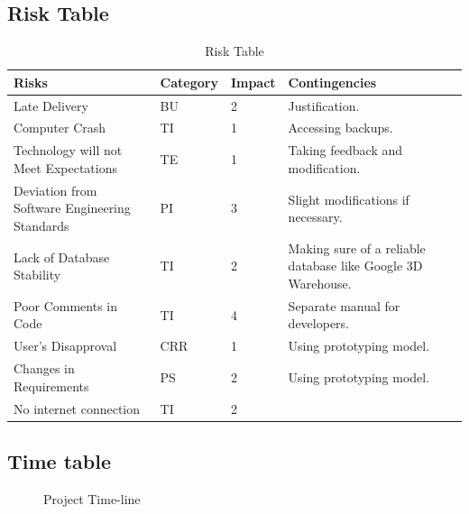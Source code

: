 \subsection{Risk Table}
\begin{table}[h!]
\caption{Risk Table}
  \centering
\begin{tabular}{|p{3.5cm}| p{2cm} | p{2.3cm} | p{4cm}|}
\hline
Risks                                         & Category  & Impact &Contingencies \\ \hline
Late Delivery                                & BU               & 2   &  Justification. \\ \hline
Computer Crash                                 & TI              & 1 & Accessing backups.   \\ \hline
Technology will not Meet Expectations         & TE            & 1    & Taking feedback and modification. \\ \hline
Deviation from Software Engineering Standards       & PI               & 3  & Slight modifications if necessary.  \\ \hline
Lack of Database Stability                & TI             & 2   &  Making sure of a reliable database like Google 3D Warehouse. \\ \hline
Poor Comments in Code                         & TI              & 4  & Separate manual for developers.   \\ \hline
User’s Disapproval                            & CRR             & 1   & Using prototyping model.  \\ \hline
Changes in Requirements                                & PS             & 2   &  Using prototyping model. \\ \hline
No internet connection                        & TI             & 2  &    \\ \hline
\end{tabular}
\end{table}
\newpage
\subsection{Time table}
\begin{figure}[htbp]
	\centering
	\caption{Project Time-line}
	\label{fig:gantt}
\end{figure}